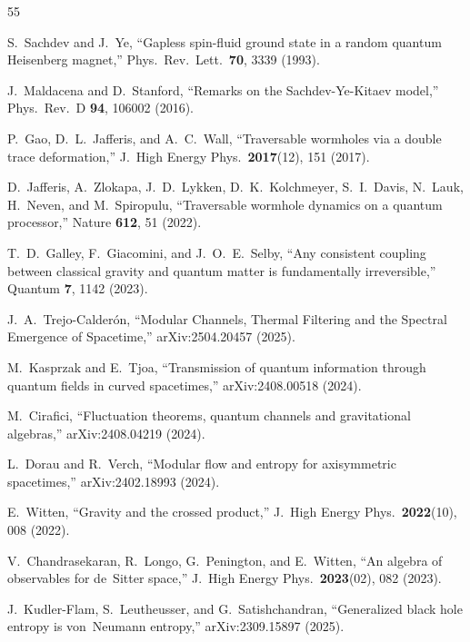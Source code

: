 \documentclass[prl,twocolumn,superscriptaddress,longbibliography,floatfix]{revtex4-2}
\begin{document}
\begin{thebibliography}{55}

S.~Sachdev and J.~Ye,
``Gapless spin-fluid ground state in a random quantum
Heisenberg magnet,''
Phys.\ Rev.\ Lett.\ \textbf{70}, 3339 (1993).

J.~Maldacena and D.~Stanford,
``Remarks on the Sachdev-Ye-Kitaev model,''
Phys.\ Rev.\ D \textbf{94}, 106002 (2016).

P.~Gao, D.~L.~Jafferis, and A.~C.~Wall,
``Traversable wormholes via a double trace deformation,''
J.\ High Energy Phys.\ \textbf{2017}(12), 151 (2017).

D.~Jafferis, A.~Zlokapa, J.~D.~Lykken, D.~K.~Kolchmeyer,
S.~I.~Davis, N.~Lauk, H.~Neven, and M.~Spiropulu,
``Traversable wormhole dynamics on a quantum processor,''
Nature \textbf{612}, 51 (2022).


T.~D.~Galley, F.~Giacomini, and J.~O.~E.~Selby,
``Any consistent coupling between classical gravity and
quantum matter is fundamentally irreversible,''
Quantum \textbf{7}, 1142 (2023).

J.~A.~Trejo-Calder\'{o}n,
``Modular Channels, Thermal Filtering and the Spectral
Emergence of Spacetime,''
arXiv:2504.20457 (2025).

M.~Kasprzak and E.~Tjoa,
``Transmission of quantum information through quantum fields
in curved spacetimes,''
arXiv:2408.00518 (2024).

M.~Cirafici,
``Fluctuation theorems, quantum channels and gravitational
algebras,''
arXiv:2408.04219 (2024).

L.~Dorau and R.~Verch,
``Modular flow and entropy for axisymmetric spacetimes,''
arXiv:2402.18993 (2024).

E.~Witten,
``Gravity and the crossed product,''
J.\ High Energy Phys.\ \textbf{2022}(10), 008 (2022).

V.~Chandrasekaran, R.~Longo, G.~Penington, and E.~Witten,
``An algebra of observables for de~Sitter space,''
J.\ High Energy Phys.\ \textbf{2023}(02), 082 (2023).

J.~Kudler-Flam, S.~Leutheusser, and G.~Satishchandran,
``Generalized black hole entropy is von~Neumann entropy,''
arXiv:2309.15897 (2025).


\end{thebibliography}
\end{document}
